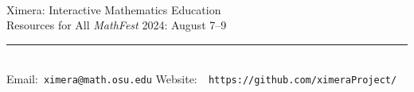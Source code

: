 \documentclass{article}
\begin{document}
\sffamily\flushleft
\hspace{-.3cm}\\
Ximera: Interactive Mathematics Education  \\[-.1cm] Resources for All\hfill
\textsl{MathFest} 2024: August 7--9\\[.1cm]
\rule{\textwidth}{.1cm}\\[.1cm]\rmfamily
Email:~{\tt ximera@math.osu.edu} \hfill Website:~{\tt
https://github.com/ximeraProject/}\\[1cm]
\end{document}

